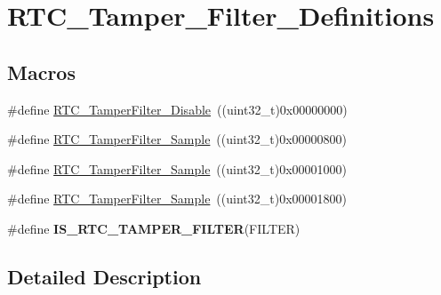 \hypertarget{group___r_t_c___tamper___filter___definitions}{\section{R\-T\-C\-\_\-\-Tamper\-\_\-\-Filter\-\_\-\-Definitions}
\label{group___r_t_c___tamper___filter___definitions}
}
\subsection*{Macros}
\begin{DoxyCompactItemize}
\item 
\#define \hyperlink{group___r_t_c___tamper___filter___definitions_ga606745baf6ebc29dec3ab8f4af69f9e7}{R\-T\-C\-\_\-\-Tamper\-Filter\-\_\-\-Disable}~((uint32\-\_\-t)0x00000000)
\item 
\#define \hyperlink{group___r_t_c___tamper___filter___definitions_gae036968e2f4d9ed7d71587df94bd2f41}{R\-T\-C\-\_\-\-Tamper\-Filter\-\_\-Sample}~((uint32\-\_\-t)0x00000800)
\item 
\#define \hyperlink{group___r_t_c___tamper___filter___definitions_ga1d36f9a5326a4ed71de0f28365ee65e6}{R\-T\-C\-\_\-\-Tamper\-Filter\-\_\-Sample}~((uint32\-\_\-t)0x00001000)
\item 
\#define \hyperlink{group___r_t_c___tamper___filter___definitions_gae84bc688a4eca9fd17ece6df6436c9ca}{R\-T\-C\-\_\-\-Tamper\-Filter\-\_\-Sample}~((uint32\-\_\-t)0x00001800)
\item 
\#define {\bfseries I\-S\-\_\-\-R\-T\-C\-\_\-\-T\-A\-M\-P\-E\-R\-\_\-\-F\-I\-L\-T\-E\-R}(F\-I\-L\-T\-E\-R)
\end{DoxyCompactItemize}


\subsection{Detailed Description}


